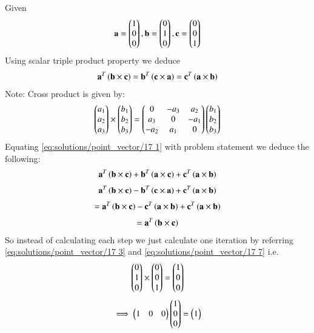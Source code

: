 Given
\begin{align}
\label{eq:solutions/point_vector/17 1}
\mathbf{a}=\begin{pmatrix}1\\0\\0\end{pmatrix}, 
\mathbf{b}=\begin{pmatrix}0\\1\\0\end{pmatrix}, 
\mathbf{c}=\begin{pmatrix}0\\0\\1\end{pmatrix}
\end{align}
Using scalar triple product property we deduce
\begin{align}
\mathbf{a}^{T}
\left(
\mathbf{b}\times
\mathbf{c}
\right)=
\mathbf{b}^{T}
\left(
\mathbf{c}\times
\mathbf{a}
\right)=
\mathbf{c}^{T}
\left(
\mathbf{a}\times
\mathbf{b}
\right)
\end{align}
Note: Cross product is given by:
\begin{align}
\label{eq:solutions/point_vector/17 3}
\begin{pmatrix}a_1\\a_2\\a_3\end{pmatrix}\times
\begin{pmatrix}b_1\\b_2\\b_3\end{pmatrix}=
\begin{pmatrix}0&-a_3&a_2\\a_3&0&-a_1\\-a_2&a_1&0\end{pmatrix}
\begin{pmatrix}b_1\\b_2\\b_3\end{pmatrix}
\end{align}
Equating \eqref{eq:solutions/point_vector/17 1} with problem statement we deduce the following:
\begin{align}
\vec{a}^T
\brak{
\vec{b}\times
\vec{c}
}+
\Vec{b}^T
\brak{
\vec{a}\times
\vec{c}
}+
\vec{c}^T
\brak{
\vec{a}\times
\vec{b}
}
\end{align}
\begin{align}
\vec{a}^T
\brak{
\vec{b}\times
\vec{c}
}-
\Vec{b}^T
\brak{
\vec{c}\times
\vec{a}
}+
\vec{c}^T
\brak{
\vec{a}\times
\vec{b}
}
\end{align}
\begin{align}
=\mathbf{a}^{T}
\left(
\mathbf{b}\times
\mathbf{c}
\right)-
\mathbf{c}^T
\left(
\mathbf{a}\times
\mathbf{b}
\right)+
\mathbf{c}^{T}
\left(
\mathbf{a}\times
\mathbf{b}
\right)
\end{align}
\begin{align}
\label{eq:solutions/point_vector/17 7}
=\mathbf{a}^{T}
\left(
\mathbf{b}\times
\mathbf{c}
\right)
\end{align}
So instead of calculating each step we just calculate one iteration by referring \eqref{eq:solutions/point_vector/17 3} and \eqref{eq:solutions/point_vector/17 7} i.e.
\begin{align}
\begin{pmatrix}0\\1\\0\end{pmatrix}\times
\begin{pmatrix}0\\0\\1\end{pmatrix}=
\begin{pmatrix}1\\0\\0\end{pmatrix}
\end{align}
\begin{align}
\implies
\begin{pmatrix}1&0&0\end{pmatrix}
\begin{pmatrix}1\\0\\0\end{pmatrix}=
\begin{pmatrix}1\end{pmatrix}
\end{align}
